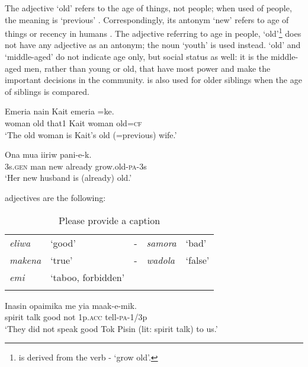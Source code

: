  The adjective  `old' refers to the age of things, not people; when used of people, the meaning is `previous' . Correspondingly, its antonym  `new' refers to age of things or recency in humans . The adjective referring to age in people,  `old'\footnote{ is derived from the verb - `grow old'.} does not have any adjective as an antonym; the noun  `youth' is used instead.  `old' and  `middle-aged' do not indicate age only, but social status as well: it is the middle-aged men, rather than young or old, that have most power and make the important decisions in the community.  is also used for older siblings when the age of siblings is compared.

\ea%
\label{ex:3:x74}
\gll Emeria  nain Kait emeria =ke. \\
woman old that1 Kait woman old=\textsc{cf}\\
\glt`The old woman is Kait's old (=previous) wife.'
\z

\ea%
\label{ex:3:x75}
\gll Ona mua  iiriw pani-e-k. \\
3s.\textsc{gen} man new already grow.old-\textsc{pa}-3s\\
\glt`Her new husband is (already) old.'
\z

 adjectives are the following: 

\begin{table}
\caption{Please provide a caption}
\label{}
\begin{tabular}{>{\itshape}llc>{\itshape}ll}
\mytoprule
eliwa &`good' &- &samora &`bad'\\
makena &`true' &- &wadola &`false'\\
emi &`taboo, forbidden'\\
\mybottomrule
\end{tabular}
\end{table}

\ea%
\label{ex:3:x1760}
\gll Inasin opaimika  me yia maak-e-mik. \\
spirit talk good not 1p.\textsc{acc} tell-\textsc{pa}-1/3p\\
\glt`They did not speak good Tok Pisin (lit: spirit talk) to us.'
\z

